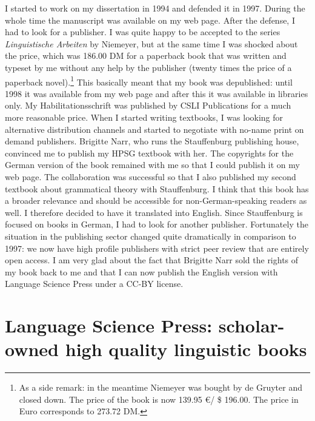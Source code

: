 I started to work on my dissertation in 1994 and defended it in 1997. During the whole time the
manuscript was available on my web page. After the defense, I had to look for a publisher. I was
quite happy to be accepted to the series \emph{Linguistische Arbeiten} by Niemeyer, but at the same time I
was shocked about the price, which was 186.00 DM for a paperback book that was written and typeset
by me without any help by the publisher (twenty times the price of a paperback novel).\footnote{
  As a side remark: in the meantime Niemeyer was bought by de Gruyter and closed down. The price of the book is now
  139.95 \euro / \$ 196.00. The price in Euro corresponds to 273.72 DM. 
} This
basically meant that my book was depublished: until 1998 it was available from my web page and after
this it was available in libraries only. My Habilitationsschrift was published by CSLI Publications
for a much more reasonable price. When I started writing textbooks, I was looking for alternative
distribution channels and started to negotiate with no-name print on demand publishers. Brigitte Narr,
who runs the Stauffenburg publishing house, convinced me to publish my HPSG textbook with her. The
copyrights for the German version of the book remained with me so that I could publish it on my web page. The collaboration was successful so that I also published my second textbook about
grammatical theory with Stauffenburg. I think that this book has a broader relevance and should be
accessible for non-German-speaking readers as well. I therefore decided to have it translated into
English. Since Stauffenburg is focused on books in German, I had to look for another publisher. Fortunately the situation in the publishing sector changed quite dramatically in comparison
to 1997: we now have high profile publishers with strict peer review that are entirely open access. I am very
glad about the fact that Brigitte Narr sold the rights of my book back to me and that I can now 
publish the English version with Language Science Press under a CC-BY license.


\section*{Language Science Press: scholar-owned high quality linguistic books}

